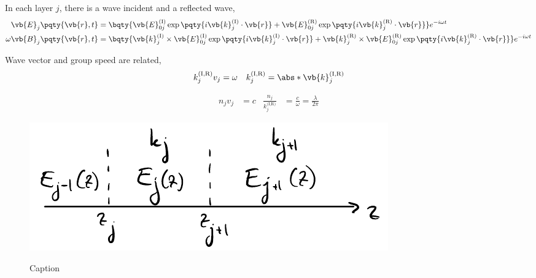 In each layer $j$, there is a wave incident  and a reflected  wave,
\begin{align*}
	\vb{E}_j\pqty{\vb{r},t} &= 
		\bqty{
			\vb{E}_{0j}^{(\text{I})}\exp\pqty{i\vb{k}_j^{(\text{I})}\cdot\vb{r}} + 
			\vb{E}_{0j}^{(\text{R})}\exp\pqty{i\vb{k}_j^{(\text{R})}\cdot\vb{r}}
		} e^{-i \omega t}\\
	\omega\vb{B}_j\pqty{\vb{r},t} &= 
		\bqty{
			\vb{k}_j^{(\text{I})}\times\vb{E}_{0j}^{(\text{I})}\exp\pqty{i\vb{k}_j^{(\text{I})}\cdot\vb{r}} + 
			\vb{k}_j^{(\text{R})}\times\vb{E}_{0j}^{(\text{R})}\exp\pqty{i\vb{k}_j^{(\text{R})}\cdot\vb{r}}
		} e^{-i \omega t}
\end{align*}

Wave vector and group speed are related,
\begin{align*}
	k_j^{\text{(I,R)}}v_j &= \omega & k_j^{\text{(I,R)}} = \abs*{\vb{k}_j^{\text{(I,R)}}}
\end{align*}

\begin{align*}
	n_j v_j &= c & \frac{n_j}{k_j^{\text{(I,R)}}} &= \frac{c}{\omega} = \frac{\lambda}{2\pi}
\end{align*}


\begin{figure}
\begin{center}
    {\includegraphics{Figures/SpaceDiscretion.pdf}
    }
\caption{
Caption
}
\label{fig:1}
\end{center}
\end{figure}

